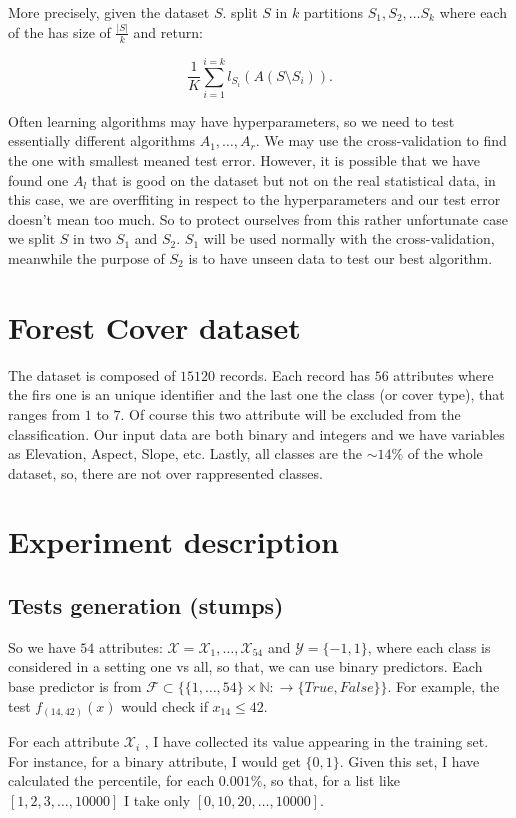 \documentclass{article}
\begin{document}
More precisely, given the dataset $S$. split $S$ in $k$ partitions $S_1, S_2, \dots S_k$ where each of the 
has size of $\frac{|S|}{k}$ and return:

$$\frac{1}{K}\sum_{i=1}^{i=k} l_{S_i}(A(S\setminus S_i)).$$

Often learning algorithms may have hyperparameters, so we need to test essentially different algorithms $A_1,\dots,A_r$.
We may use the cross-validation to find the one with smallest meaned test error. However,
it is possible that we have found one $A_l$ that is good on the dataset but not on the real statistical data,
in this case, we are overffiting in respect to the hyperparameters and our test error doesn't mean too much. 
So to protect ourselves from this rather unfortunate case we split $S$ in two $S_1$ and $S_2$.
$S_1$ will be used normally with the cross-validation, meanwhile the purpose of $S_2$ is to have
unseen data to test our best algorithm.

\section{Forest Cover dataset}

The dataset is composed of $15120$ records. Each record has $56$ attributes where the firs one
is an unique identifier and the last one the class (or cover type), that ranges from $1$ to $7$.
Of course this two attribute will be excluded from the classification.
Our input data are both binary and integers and we have variables as Elevation, Aspect, Slope, etc.
Lastly, all classes are the $\sim 14\%$ of the whole dataset, so, there are not over rappresented classes.

\section{Experiment description}
\subsection{Tests generation (stumps)}
So we have $54$ attributes: $\mathcal{X} = \mathcal{X}_1, \dots,\mathcal{X}_{54}$ and $\mathcal{Y} = \{-1,1\}$, where
each class is considered in a setting one vs all, so that, we can use binary predictors.
Each base predictor is from $ \mathcal{F} \subset \{\{1,\dots,54\}\times \mathbb{N}: \rightarrow \{True,False\}\}$.
For example, the test $f_{(14,42)}(x)$ would check if $x_{14} \leq 42$.

For each attribute $\mathcal{X}_i$ , I have collected its value appearing in the training set.
For instance, for a binary attribute, I would get $\{0,1\}$. Given this set, I have
calculated the percentile, for each $0.001\%$, so that, for a list like $[1,2,3,\dots,10000]$
I take only $[0,10,20,\dots,10000]$.
\end{document}
